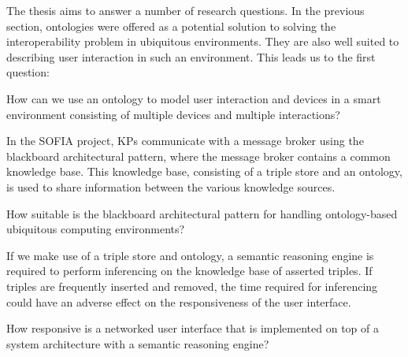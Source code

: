 

The thesis aims to answer a number of research questions. In the previous section, ontologies were offered as a potential solution to solving the interoperability problem in ubiquitous environments. They are also well suited to describing user interaction in such an environment. This leads us to the first question:

\begin{question}
How can we use an ontology to model user interaction and devices in a smart environment consisting of multiple devices and multiple interactions? 
\end{question}


\label{blackboard}
In the \ac{SOFIA} project, \acp{KP} communicate with a message broker using the blackboard architectural pattern, where the message broker contains a common knowledge base. This knowledge base, consisting of a triple store and an ontology, is used to share information between the various knowledge sources.

\begin{question}
How suitable is the blackboard architectural pattern for handling ontology-based ubiquitous computing environments? 
\end{question}


If we make use of a triple store and ontology, a semantic reasoning engine is required to perform inferencing on the knowledge base of asserted triples. If triples are frequently inserted and removed, the time required for inferencing could have an adverse effect on the responsiveness of the user interface.  

\begin{question}
How responsive is a networked user interface that is implemented on top of a system architecture with a semantic reasoning engine? 
\end{question}

